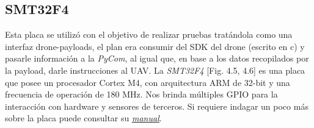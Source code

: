 \documentclass[12pt]{article}
\begin{document}
\subsection*{SMT32F4}
Esta placa se utilizó con el objetivo de realizar pruebas tratándola como una interfaz drone-payloads, el plan era consumir del SDK del drone (escrito en c) y pasarle información a la \textit{PyCom}, al igual que, en base a los datos recopilados por la payload, darle instrucciones al UAV.
La \textit{SMT32F4} [Fig. 4.5, 4.6] es una placa que posee un procesador Cortex M4, con arquitectura ARM de 32-bit y una frecuencia de operación de 180 MHz. Nos brinda múltiples GPIO para la interacción con hardware y sensores de terceros. Si requiere indagar un poco más sobre la placa puede consultar su \href{https://drive.google.com/file/d/182H9i1qmJ2UCbynztxymEA3nfmx_eGrk/view?usp=share_link}{\textit{manual}}.
\end{document}
